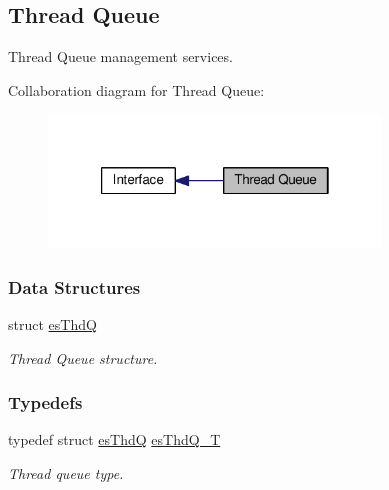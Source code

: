 \hypertarget{group__kern__thdq}{\subsection{Thread Queue}
\label{group__kern__thdq}
}


Thread Queue management services.  


Collaboration diagram for Thread Queue\-:\nopagebreak
\begin{figure}[H]
\begin{center}
\leavevmode
\includegraphics[width=250pt]{group__kern__thdq}
\end{center}
\end{figure}
\subsubsection*{Data Structures}
\begin{DoxyCompactItemize}
\item 
struct \hyperlink{structesThdQ}{es\-Thd\-Q}
\begin{DoxyCompactList}\small\item\em Thread Queue structure. \end{DoxyCompactList}\end{DoxyCompactItemize}
\subsubsection*{Typedefs}
\begin{DoxyCompactItemize}
\item 
typedef struct \hyperlink{structesThdQ}{es\-Thd\-Q} \hyperlink{group__kern__thdq_ga7a1a060699e83a01512ebb5540019556}{es\-Thd\-Q\-\_\-\-T}
\begin{DoxyCompactList}\small\item\em Thread queue type. \end{DoxyCompactList}\end{DoxyCompactItemize}
